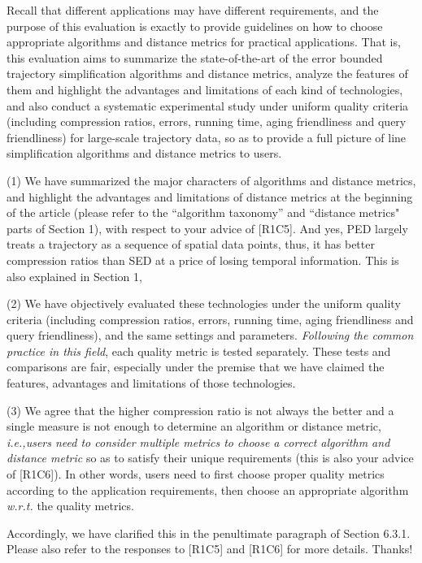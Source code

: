 \documentclass{letter}
\newcommand{\ie}{\emph{i.e.,}\xspace}
\newcommand{\wrt}{\emph{w.r.t.}\xspace}
\begin{document}
Recall that different applications may have different requirements, and the purpose of this evaluation is exactly to
provide guidelines on how to choose appropriate algorithms and distance metrics for practical applications.
That is, this evaluation aims to summarize the state-of-the-art of the error bounded trajectory simplification algorithms and distance metrics, analyze the features of them and highlight the advantages and limitations of each kind of technologies, and also conduct a systematic experimental study under uniform quality criteria (including compression ratios, errors, running time, aging friendliness and query friendliness) for large-scale trajectory data, so as to provide a full picture of line simplification algorithms and distance metrics to users.

(1) We have summarized the major characters of algorithms and distance metrics, and highlight the advantages and limitations of distance metrics at the beginning of the article (please refer to the ``algorithm taxonomy'' and ``distance metrics" parts of Section 1), with respect to your advice of [R1C5]. And yes, PED largely treats a trajectory as a sequence of spatial data points, thus, it has better compression ratios than SED at a price of losing temporal information. This is also explained in Section 1,

(2) We have objectively evaluated these technologies under the uniform quality criteria (including compression ratios, errors, running time, aging friendliness and query friendliness), and the same settings and parameters. {\em Following the common practice in this field}, each quality metric is tested separately. These tests and comparisons are fair, especially under the premise that we have claimed the features, advantages and limitations of those technologies. %

(3) We agree that the higher compression ratio is not always the better and a single measure is not enough to determine an algorithm or distance metric, \ie \emph{users need to consider multiple metrics to choose a correct algorithm and distance metric} so as to satisfy their unique requirements (this is also your advice of [R1C6]). In other words, users need to first choose proper quality metrics according to the application requirements, then choose an appropriate algorithm \wrt the quality metrics.

Accordingly, we have clarified this in the penultimate paragraph of Section 6.3.1. Please also refer to the responses to [R1C5] and [R1C6] for more details. Thanks!
\end{document}
